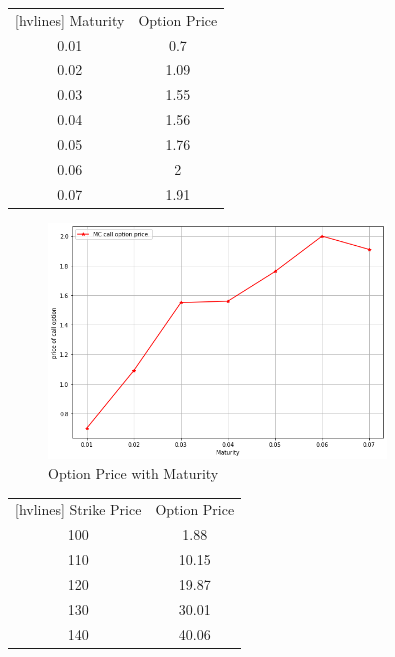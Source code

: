 
\begin{center}
	\begin{NiceTabular}{|c|c|}[hvlines]
		 Maturity & Option Price\\ 
		0.01 & 0.7 \\ 
		0.02 & 1.09 \\
		0.03 & 1.55 \\
		0.04 & 1.56  \\
		0.05 & 1.76 \\
		0.06 & 2 \\
		0.07 & 1.91 \\
	\end{NiceTabular}
\end{center}

\begin{figure}[H]
	\begin{center}
		\includegraphics[width=0.8\textwidth]{MC_Barrier_Option_With_Maturity}
	\end{center}
	\caption{Option Price with Maturity}
\end{figure}


\begin{center}
	\begin{NiceTabular}{|c|c|}[hvlines]
		 Strike Price & Option Price\\ 
		100 & 1.88 \\ 
		110 & 10.15 \\
		120 & 19.87 \\
		130 & 30.01  \\
		140 & 40.06 \\
	\end{NiceTabular}
\end{center}

